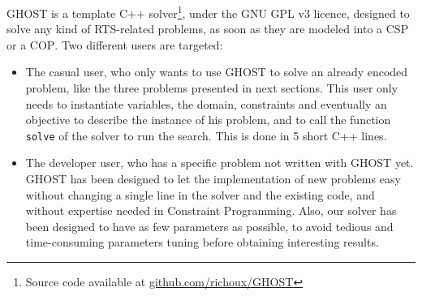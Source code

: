 \documentclass{article}
\newcommand{\csp}{\textsc{CSP}\xspace}
\newcommand{\cop}{\textsc{COP}\xspace}
\newcommand{\ghost}{\textsc{GHOST}\xspace}
\begin{document}
\ghost  is a  template  C++ solver\footnote{Source  code available  at
  \href{https://github.com/richoux/GHOST}{github.com/richoux/GHOST}},
under  the  GNU  GPL  v3  licence,  designed  to  solve  any  kind  of
RTS-related problems,  as soon as  they are modeled  into a \csp  or a
\cop. Two different users are targeted:
\begin{itemize}
\item  The casual  user, who  only  wants to  use \ghost  to solve  an
  already encoded problem,  like the three problems  presented in next
  sections.   This  user  only  needs to  instantiate  variables,  the
  domain,  constraints and  eventually  an objective  to describe  the
  instance of his problem, and  to call the function \texttt{solve} of
  the solver to run the search. This is done in 5 short C++ lines.
\item The developer user, who has  a specific problem not written with
  \ghost yet.  \ghost  has been designed to let  the implementation of
  new problems easy  without changing a single line in  the solver and
  the  existing  code,  and  without expertise  needed  in  Constraint
  Programming.   Also, our  solver has  been designed  to have  as few
  parameters  as   possible,  to  avoid  tedious   and  time-consuming
  parameters tuning before obtaining interesting results.
\end{itemize}
\end{document}
